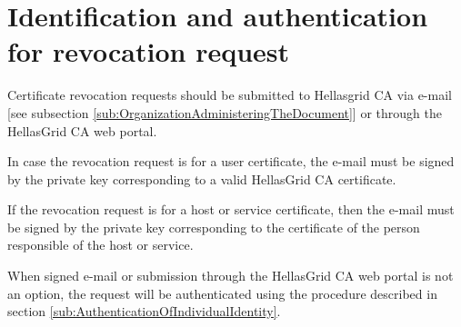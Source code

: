 \section{Identification and authentication for revocation request}

Certificate revocation requests should be submitted to Hellasgrid CA via e-mail [see subsection \ref{sub:OrganizationAdministeringTheDocument}] or through the HellasGrid CA web portal. 

In case the revocation request is for a user certificate, the e-mail must be signed by the private key corresponding to a valid HellasGrid CA certificate.
 
If the revocation request is for a host or service certificate, then the e-mail must be signed by the private key corresponding to the certificate of the person responsible of the host or service.

When signed e-mail or submission through the HellasGrid CA web portal is not an option, the request will be authenticated using the procedure described in section \ref{sub:AuthenticationOfIndividualIdentity}.


